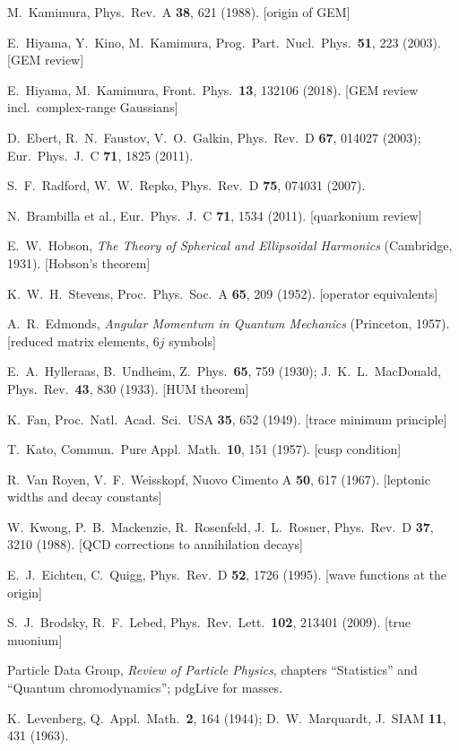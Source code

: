 \documentclass[11pt,a4paper]{article}
\numberwithin{equation}{section}
\theoremstyle{definition}
\theoremstyle{plain}
\theoremstyle{remark}
\numberwithin{algorithm}{section}
\begin{document}
\begin{small}
\begin{enumerate}[label={[\arabic*]},leftmargin=2.2em,itemsep=1pt]
\item M.~Kamimura, Phys.\ Rev.\ A \textbf{38}, 621 (1988). [origin of GEM]
\item E.~Hiyama, Y.~Kino, M.~Kamimura, Prog.\ Part.\ Nucl.\ Phys.\ \textbf{51}, 223 (2003). [GEM review]
\item E.~Hiyama, M.~Kamimura, Front.\ Phys.\ \textbf{13}, 132106 (2018). [GEM review incl.\ complex-range Gaussians]
\item D.~Ebert, R.~N.~Faustov, V.~O.~Galkin, Phys.\ Rev.\ D \textbf{67}, 014027 (2003); Eur.\ Phys.\ J.\ C \textbf{71}, 1825 (2011).
\item S.~F.~Radford, W.~W.~Repko, Phys.\ Rev.\ D \textbf{75}, 074031 (2007).
\item N.~Brambilla et al., Eur.\ Phys.\ J.\ C \textbf{71}, 1534 (2011). [quarkonium review]
\item E.~W.~Hobson, \emph{The Theory of Spherical and Ellipsoidal Harmonics} (Cambridge, 1931). [Hobson's theorem]
\item K.~W.~H.~Stevens, Proc.\ Phys.\ Soc.\ A \textbf{65}, 209 (1952). [operator equivalents]
\item A.~R.~Edmonds, \emph{Angular Momentum in Quantum Mechanics} (Princeton, 1957). [reduced matrix elements, $6j$ symbols]
\item E.~A.~Hylleraas, B.~Undheim, Z.\ Phys.\ \textbf{65}, 759 (1930); J.~K.~L.~MacDonald, Phys.\ Rev.\ \textbf{43}, 830 (1933). [HUM theorem]
\item K.~Fan, Proc.\ Natl.\ Acad.\ Sci.\ USA \textbf{35}, 652 (1949). [trace minimum principle]
\item T.~Kato, Commun.\ Pure Appl.\ Math.\ \textbf{10}, 151 (1957). [cusp condition]
\item R.~Van Royen, V.~F.~Weisskopf, Nuovo Cimento A \textbf{50}, 617 (1967). [leptonic widths and decay constants]
\item W.~Kwong, P.~B.~Mackenzie, R.~Rosenfeld, J.~L.~Rosner, Phys.\ Rev.\ D \textbf{37}, 3210 (1988). [QCD corrections to annihilation decays]
\item E.~J.~Eichten, C.~Quigg, Phys.\ Rev.\ D \textbf{52}, 1726 (1995). [wave functions at the origin]
\item S.~J.~Brodsky, R.~F.~Lebed, Phys.\ Rev.\ Lett.\ \textbf{102}, 213401 (2009). [true muonium]
\item Particle Data Group, \emph{Review of Particle Physics}, chapters ``Statistics'' and ``Quantum chromodynamics''; pdgLive for masses.
\item K.~Levenberg, Q.\ Appl.\ Math.\ \textbf{2}, 164 (1944); D.~W.~Marquardt, J.\ SIAM \textbf{11}, 431 (1963).

\end{enumerate}
\end{small}
\end{document}
